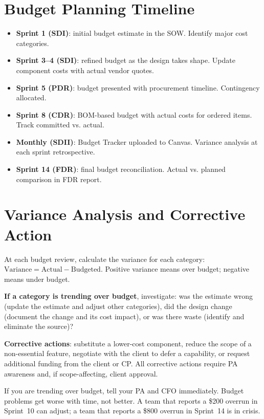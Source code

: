 \section{Budget Planning Timeline}
\begin{itemize}[nosep,leftmargin=1.5em]
\item \textbf{Sprint 1 (SDI)}: initial budget estimate in the SOW. Identify major cost categories.
\item \textbf{Sprint 3--4 (SDI)}: refined budget as the design takes shape. Update component costs with actual vendor quotes.
\item \textbf{Sprint 5 (PDR)}: budget presented with procurement timeline. Contingency allocated.
\item \textbf{Sprint 8 (CDR)}: BOM-based budget with actual costs for ordered items. Track committed vs. actual.
\item \textbf{Monthly (SDII)}: Budget Tracker uploaded to Canvas. Variance analysis at each sprint retrospective.
\item \textbf{Sprint 14 (FDR)}: final budget reconciliation. Actual vs. planned comparison in FDR report.
\end{itemize}

\section{Variance Analysis and Corrective Action}
At each budget review, calculate the variance for each category: $\text{Variance} = \text{Actual} - \text{Budgeted}$. Positive variance means over budget; negative means under budget.

\textbf{If a category is trending over budget}, investigate: was the estimate wrong (update the estimate and adjust other categories), did the design change (document the change and its cost impact), or was there waste (identify and eliminate the source)?

\textbf{Corrective actions}: substitute a lower-cost component, reduce the scope of a non-essential feature, negotiate with the client to defer a capability, or request additional funding from the client or CP. All corrective actions require PA awareness and, if scope-affecting, client approval.

\begin{warningbox}
If you are trending over budget, tell your PA and CFO immediately. Budget problems get worse with time, not better. A team that reports a \$200 overrun in Sprint~10 can adjust; a team that reports a \$800 overrun in Sprint~14 is in crisis.
\end{warningbox}

